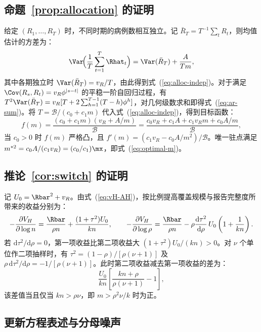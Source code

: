 \subsection{命题~\ref{prop:allocation} 的证明}
\label{app:prop3}

给定 $(R_1,\dots,R_T)$ 时，不同时期的病例数相互独立。记 $\bar{R}_T=T^{-1}\sum_tR_t$，则均值估计的方差为：
\begin{equation}
  \Var\!\Big(\frac{1}{T}\sum_{t=1}^T\Rhat_t\Big)=\Var(\bar{R}_T)+\frac{A}{Tm},
\end{equation}
其中各期独立时 $\Var(\bar{R}_T)=v_R/T$，由此得到式~(\ref{eq:alloc-indep})。对于满足 $\Cov(R_s,R_t)=v_R\phi^{|s-t|}$ 的平稳一阶自回归过程，有 $T^2\Var(\bar{R}_T)=v_R[T+2\sum_{h=1}^{T-1}(T-h)\phi^h]$，对几何级数求和即得式~(\ref{eq:ar-sum})\citep{hamilton1994time}。将 $T=\mathcal{B}/(c_0+c_1m)$ 代入式~(\ref{eq:alloc-indep})，得到目标函数：
\begin{equation}
  f(m)=\frac{(c_0+c_1m)(v_R+A/m)}{\mathcal{B}}=\frac{c_0v_R+c_1A+c_1v_Rm+c_0A/m}{\mathcal{B}},
\end{equation}
当 $c_0>0$ 时 $f(m)$ 严格凸，且 $f'(m)=(c_1v_R-c_0A/m^2)/\mathcal{B}$。唯一驻点满足 $m^{*2}=c_0A/(c_1v_R)=(c_0/c_1)\mx$，即式~(\ref{eq:optimal-m})。

\subsection{推论~\ref{cor:switch} 的证明}
\label{app:cor1}

记 $U_0=\Rbar^2+v_R$。由式~(\ref{eq:vH-AH})，按比例提高覆盖规模与报告完整度所带来的收益分别为：
\begin{equation}
  -\frac{\partial V_H}{\partial\log n}=\frac{\Rbar}{\rho n}+\frac{(1+\tau^2)U_0}{kn},\qquad %
  -\frac{\partial V_H}{\partial\log\rho}=\frac{\Rbar}{\rho n}-\rho\frac{\mathrm{d}\tau^2}{\mathrm{d}\rho}\,U_0\left(1+\frac{1}{kn}\right).
\end{equation}
若 $\mathrm{d}\tau^2/\mathrm{d}\rho=0$，第一项收益比第二项收益大 $(1+\tau^2)U_0/(kn)>0$。对 $\nu$ 个单位作二项抽样时，有 $\tau^2=(1-\rho)/[\rho(\nu+1)]$ 及 $\rho\,\mathrm{d}\tau^2/\mathrm{d}\rho=-1/[\rho(\nu+1)]$。此时第二项收益减去第一项收益的差为：
\begin{equation}
  \frac{U_0}{kn}\left[\frac{kn+\rho}{\rho(\nu+1)}-1\right],
\end{equation}
该差值当且仅当 $kn>\rho\nu$，即 $m>\rho^2\nu/k$ 时为正。

\subsection{更新方程表述与分母噪声}
\label{app:renewal}

